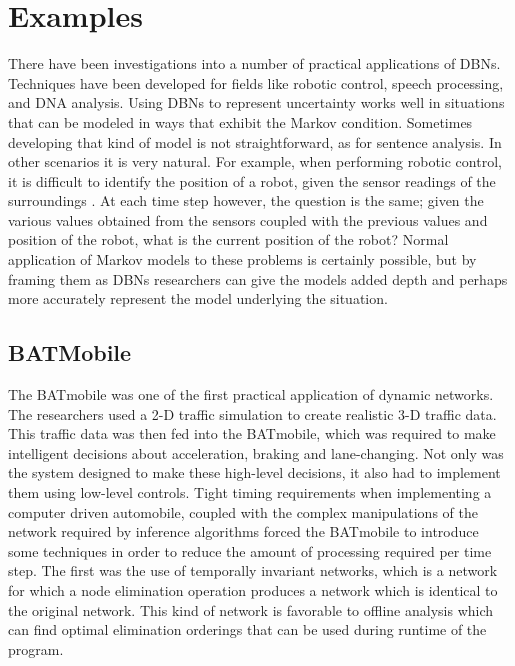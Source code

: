 \documentclass{article}
\begin{document}
\section{Examples}
There have been investigations into a number of practical applications of DBNs. Techniques have been developed for fields like robotic control, speech processing, and DNA analysis. Using DBNs to represent uncertainty works well in situations that can be modeled in ways that exhibit the Markov condition. Sometimes developing that kind of model is not straightforward, as for sentence analysis. In other scenarios it is very natural. For example, when performing robotic control, it is difficult to identify the position of a robot, given the sensor readings of the surroundings \cite{thrun98probabilistic}. At each time step however, the question is the same; given the various values obtained from the sensors coupled with the previous values and position of the robot, what is the current position of the robot? Normal application of Markov models to these problems is certainly possible, but by framing them as DBNs researchers can give the models added depth and perhaps more accurately represent the model underlying the situation. 

\subsection{BATMobile}
The BATmobile \cite{forbes95batmobile} was one of the first practical application of dynamic networks. The researchers used a 2-D traffic simulation to create realistic 3-D traffic data. This traffic data was then fed into the BATmobile, which was required to make intelligent decisions about acceleration, braking and lane-changing. Not only was the system designed to make these high-level decisions, it also had to implement them using low-level controls. Tight timing requirements when implementing a computer driven automobile, coupled with the complex manipulations of the network required by inference algorithms forced the BATmobile to introduce some techniques in order to reduce the amount of processing required per time step. The first was the use of temporally invariant networks, which is a network for which a node elimination operation produces a network which is identical to the original network. This kind of network is favorable to offline analysis which can find optimal elimination orderings that can be used during runtime of the program. 
\end{document}
